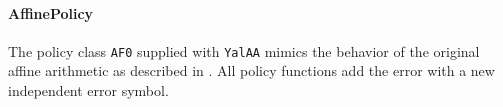 \documentclass[a4]{scrartcl}
\newcommand{\yalaa}{\texttt{YalAA}\xspace}
\begin{document}

\paragraph{AffinePolicy}
\label{sec:affinepolicy}
The policy class \texttt{AF0} supplied with \yalaa mimics the behavior of the
original affine arithmetic as described in \cite{stolfi1997}. All policy
functions add the error with a new independent error symbol.


\end{document}
